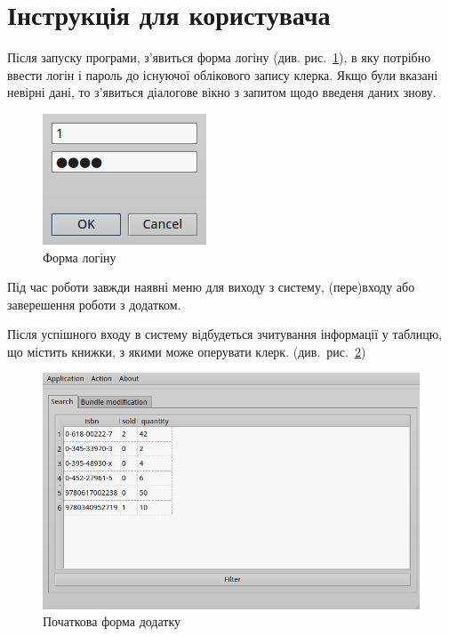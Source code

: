 \documentclass[a4paper,notitlepage,headsepline,pdftex,oneside]{report}
\newcommand{\setfontsize}[1]{\fontsize{#1pt}{#1pt}\selectfont}
\newcommand{\Section}[1]{\section{#1} \renewcommand{\baselinestretch}{1.5}\setfontsize{14pt}}
\begin{document}
    \clearpage
  \Section{Інструкція для користувача}
    Після запуску програми, з’явиться форма логіну (див.
    рис.~\ref{fig:loginform}), в яку потрібно ввести логін і пароль до існуючої
    облікового запису клерка.
    Якщо були вказані невірні дані, то з’явиться діалогове вікно з запитом
    щодо введеня даних знову.
    \begin{figure}[h]
      \centering
      \includegraphics{loginform.png}
      \caption{Форма логіну}
      \label{fig:loginform}
    \end{figure}

    Під час роботи завжди наявні меню для виходу з систему, (пере)входу або
    заверешення роботи з додатком.

    Після успішного входу в систему відбудеться зчитування інформації у
    таблицю, що містить книжки, з якими може оперувати клерк.
    (див.~рис.~\ref{fig:mainformtab1})
    \begin{figure}[h]
      \centering
      \includegraphics[width=\textwidth]{mainformtab1.png}
      \caption{Початкова форма додатку}
      \label{fig:mainformtab1}
    \end{figure}
\end{document}
